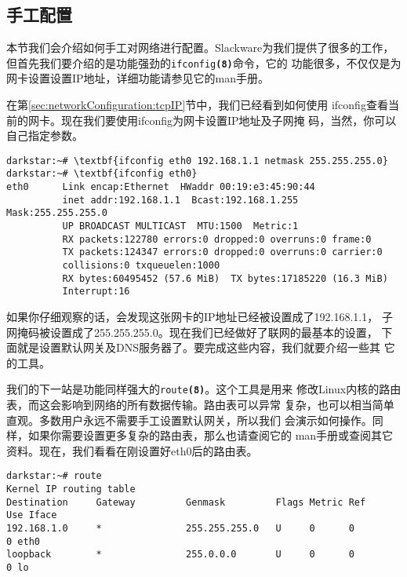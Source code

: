 \subsection{手工配置}
\label{sec:networkConfiguration:tcpIP:manual}
本节我们会介绍如何手工对网络进行配置。Slackware为我们提供了很多的工作，
但首先我们要介绍的是功能强劲的\texttt{ifconfig\textbf{(8)}}命令，它的
功能很多，不仅仅是为网卡设置设置IP地址，详细功能请参见它的man手册。

在第\ref{sec:networkConfiguration:tcpIP}节中，我们已经看到如何使用
ifconfig查看当前的网卡。现在我们要使用ifconfig为网卡设置IP地址及子网掩
码，当然，你可以自己指定参数。
\begin{Verbatim}[frame=single,commandchars=\\\{\}]
darkstar:~# \textbf{ifconfig eth0 192.168.1.1 netmask 255.255.255.0}
darkstar:~# \textbf{ifconfig eth0}
eth0      Link encap:Ethernet  HWaddr 00:19:e3:45:90:44  
          inet addr:192.168.1.1  Bcast:192.168.1.255  Mask:255.255.255.0
          UP BROADCAST MULTICAST  MTU:1500  Metric:1
          RX packets:122780 errors:0 dropped:0 overruns:0 frame:0
          TX packets:124347 errors:0 dropped:0 overruns:0 carrier:0
          collisions:0 txqueuelen:1000 
          RX bytes:60495452 (57.6 MiB)  TX bytes:17185220 (16.3 MiB)
          Interrupt:16 
\end{Verbatim}
如果你仔细观察的话，会发现这张网卡的IP地址已经被设置成了192.168.1.1，
子网掩码被设置成了255.255.255.0。现在我们已经做好了联网的最基本的设置，
下面就是设置默认网关及DNS服务器了。要完成这些内容，我们就要介绍一些其
它的工具。

我们的下一站是功能同样强大的\texttt{route\textbf{(8)}}。这个工具是用来
修改Linux内核的路由表，而这会影响到网络的所有数据传输。路由表可以异常
复杂，也可以相当简单直观。多数用户永远不需要手工设置默认网关，所以我们
会演示如何操作。同样，如果你需要设置更多复杂的路由表，那么也请查阅它的
man手册或查阅其它资料。现在，我们看看在刚设置好eth0后的路由表。
\begin{Verbatim}[frame=single,commandchars=\\\{\}]
darkstar:~# route
Kernel IP routing table
Destination     Gateway         Genmask         Flags Metric Ref    Use Iface
192.168.1.0     *               255.255.255.0   U     0      0        0 eth0
loopback        *               255.0.0.0       U     0      0        0 lo
\end{Verbatim}

